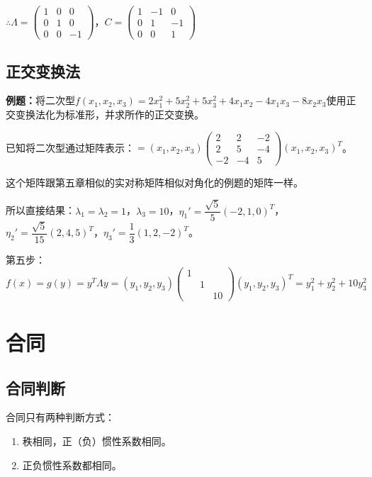 \documentclass[UTF8, 12pt]{ctexart}
\begin{document}
$\therefore\Lambda=\left(\begin{array}{ccc}
    1 & 0 & 0 \\
    0 & 1 & 0 \\
    0 & 0 & -1
\end{array}\right)$，$C=\left(\begin{array}{ccc}
    1 & -1 & 0 \\
    0 & 1 & -1 \\
    0 & 0 & 1
\end{array}\right)$

\subsection{正交变换法}

\textbf{例题：}将二次型$f(x_1,x_2,x_3)=2x_1^2+5x_2^2+5x_3^2+4x_1x_2-4x_1x_3-8x_2x_3$使用正交变换法化为标准形，并求所作的正交变换。

已知将二次型通过矩阵表示：$=(x_1,x_2,x_3)\left(\begin{array}{ccc}
    2 & 2 & -2 \\
    2 & 5 & -4 \\
    -2 & -4 & 5
\end{array}\right)(x_1,x_2,x_3)^T$。\medskip

这个矩阵跟第五章相似的实对称矩阵相似对角化的例题的矩阵一样。

所以直接结果：$\lambda_1=\lambda_2=1$，$\lambda_3=10$，$\eta_1'=\dfrac{\sqrt{5}}{5}(-2,1,0)^T$，$\eta_2'=\dfrac{\sqrt{5}}{15}(2,4,5)^T$，$\eta_3'=\dfrac{1}{3}(1,2,-2)^T$。

第五步：$f(x)=g(y)=y^T\Lambda y=(y_1,y_2,y_3)\left(\begin{array}{ccc}
    1 \\
     & 1 \\
     & & 10
\end{array}\right)(y_1,y_2,y_3)^T=y_1^2+y_2^2+10y_3^2$

\section{合同}

\subsection{合同判断}

合同只有两种判断方式：

\begin{enumerate}
    \item 秩相同，正（负）惯性系数相同。
    \item 正负惯性系数都相同。
\end{enumerate}
\end{document}
